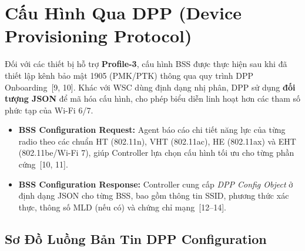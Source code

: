 \section{Cấu Hình Qua DPP (Device Provisioning Protocol)}

Đối với các thiết bị hỗ trợ \textbf{Profile-3}, cấu hình BSS được thực hiện sau khi
đã thiết lập kênh bảo mật 1905 (PMK/PTK) thông qua quy trình DPP Onboarding~[9, 10].
Khác với WSC dùng định dạng nhị phân, DPP sử dụng \textbf{đối tượng JSON} để mã hóa
cấu hình, cho phép biểu diễn linh hoạt hơn các tham số phức tạp của Wi-Fi 6/7.

\begin{itemize}
	\item \textbf{BSS Configuration Request:} Agent báo cáo chi tiết năng lực của từng
	radio theo các chuẩn HT (802.11n), VHT (802.11ac), HE (802.11ax) và EHT
	(802.11be/Wi-Fi 7), giúp Controller lựa chọn cấu hình tối ưu cho từng
	phần cứng~[10, 11].
	\item \textbf{BSS Configuration Response:} Controller cung cấp \textit{DPP Config
		Object} ở định dạng JSON cho từng BSS, bao gồm thông tin SSID, phương thức
	xác thực, thông số MLD (nếu có) và chứng chỉ mạng~[12--14].
\end{itemize}


\subsection{Sơ Đồ Luồng Bản Tin DPP Configuration}

